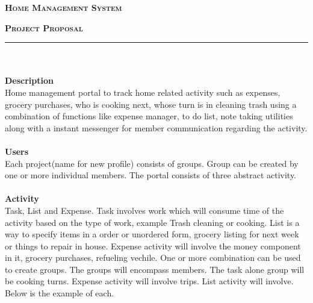 \documentclass[11]{article}
\newcommand{\HRule}{\rule{\linewidth}{0.3mm}}
\numberwithin{equation}{section}
\begin{document}
\centerline{\Large \textsc{ \textbf{Home Management System}}} \smallskip
\centerline{\large \textsc{ \textbf{Project Proposal}}} \smallskip
\noindent\HRule \\
\ \\
\textbf{Description} \\
Home management portal to track home related activity such as expenses, grocery purchases, who is cooking next, whose turn is in cleaning trash using a combination of functions like expense manager, to do list, note taking utilities along with a instant messenger for member communication regarding the activity. \\
\ \\
\noindent \textbf{Users} \\
Each project(name for new profile) consists of groups. Group can be created by one or more individual members. The portal consists of three abstract activity.  \\
\ \\
\noindent \textbf{Activity} \\
Task, List and Expense. Task involves work which will consume time of the activity based on the type of work, example Trash cleaning or cooking. List is a way to specify items in a order or unordered form, grocery listing for next week or things to repair in house. Expense activity will involve the money component in it, grocery purchases, refueling vechile. One or more combination can be used to create groups. The groups will encompass members. The task alone group will be cooking turns. Expense activity will involve trips. List activity will involve. Below is the example of each.\\
\iffalse 
\begin{minipage}{0.32\textwidth}

\end{minipage}%
\hfill
\begin{minipage}{0.32\textwidth}
\begin{tabular}{|p{\textwidth}}

\end{tabular}
\end{minipage}%
\hfill
\begin{minipage}{0.32\textwidth}
\begin{tabular}{|p{\textwidth}}

\end{tabular}
\end{minipage}%
\end{document}
